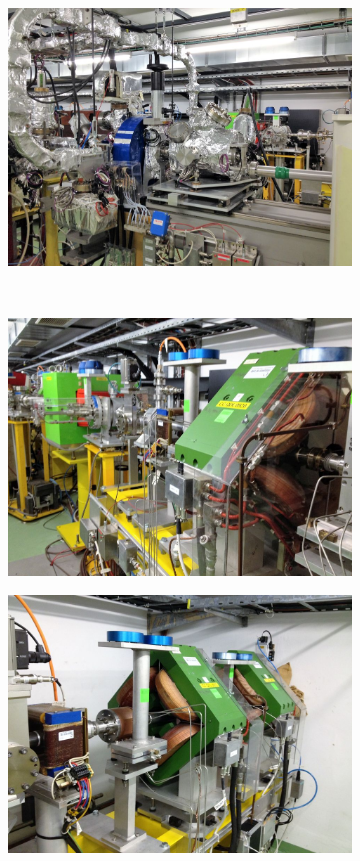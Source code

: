 \begin{figure}[tph]
\begin{subfigure}{0.5\textwidth}
		\includegraphics[width=.9\linewidth]{images/CLIC-CTF3-img1.jpg}
    \end{subfigure}        
	~
    \begin{subfigure}{0.5\textwidth}
		\centering
		\includegraphics[width=.9\linewidth]{images/CLIC-CTF3-img2.jpg}
    \end{subfigure}
	\par\bigskip
    \begin{subfigure}{0.5\textwidth}
		\centering
		\includegraphics[width=.9\linewidth]{images/CLIC-CTF3-img3.jpg}

\end{subfigure}
\end{figure}
